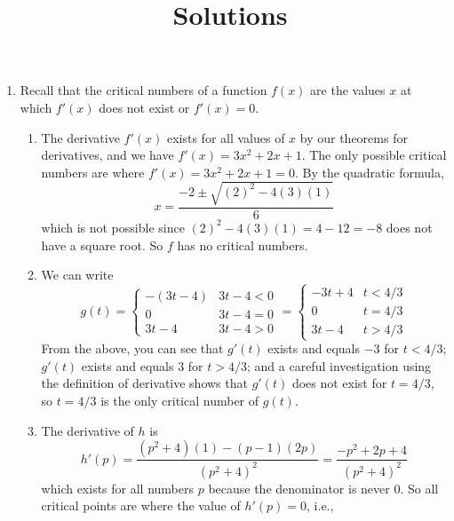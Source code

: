 \documentclass{article}
\title{\commonPSTitleZeroThreeOne\ Solutions}
\author{\commonAuthor}
\date{\commonDateZeroThreeOne}
\begin{document}
\maketitle
\begin{enumerate}
\item %
  Recall that the critical numbers of a function $f(x)$ are the values $x$ at
  which $f'(x)$ does not exist or $f'(x)=0$.
  \begin{enumerate}
  \item The derivative $f'(x)$ exists for
    all values of $x$ by our theorems for derivatives, and we have
    $f'(x)=3x^2+2x+1$.  The only possible critical numbers are where
    $f'(x)=3x^2+2x+1=0$.  By the quadratic formula,
    \begin{equation*}
      x= \frac{-2\pm \sqrt{(2)^2-4(3)(1)}}{6}
    \end{equation*}
    which is not possible since $(2)^2-4(3)(1)=4-12=-8$ does not have a square
    root.  So $f$ has no critical numbers.
  \item We can write
    \begin{equation*}
      g(t)= \begin{cases}
        -(3t-4) & \mbox{$3t-4<0$} \\
	0       & \mbox{$3t-4=0$} \\
	3t-4    & \mbox{$3t-4>0$}
      \end{cases}
      = \begin{cases}
        -3t+4 & \mbox{$t<4/3$} \\
	0     & \mbox{$t=4/3$} \\
	3t-4  & \mbox{$t>4/3$}
      \end{cases}
    \end{equation*}
    From the above, you can see that $g'(t)$ exists and equals
    $-3$ for $t<4/3$; $g'(t)$ exists and equals $3$ for $t>4/3$;
    and a careful investigation using the definition of derivative
    shows that $g'(t)$ does not exist for $t=4/3$, so $t=4/3$ is the only
    critical number of $g(t)$.
  \item The derivative of $h$ is 
    \begin{equation*}
      h'(p) = \frac{(p^2+4)(1)-(p-1)(2p)}{(p^2+4)^2}
      = \frac{-p^2+2p+4}{(p^2+4)^2}
    \end{equation*}
    which exists for all numbers $p$ because the denominator is never $0$.
    So all critical points are where the value of $h'(p)=0$, i.e.,
    \begin{equation*}

\end{equation*}
\end{enumerate}
\end{enumerate}
\end{document}
